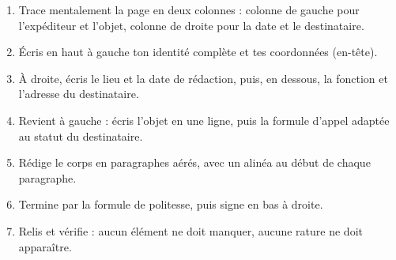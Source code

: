 \documentclass[11pt]{article}
\begin{document}
\begin{methode}
\begin{enumerate}
\item Trace mentalement la page en deux colonnes : colonne de gauche pour l'expéditeur et l'objet, colonne de droite pour la date et le destinataire.
\item Écris en haut à gauche ton identité complète et tes coordonnées (en-tête).
\item À droite, écris le lieu et la date de rédaction, puis, en dessous, la fonction et l'adresse du destinataire.
\item Revient à gauche : écris l'objet en une ligne, puis la formule d'appel adaptée au statut du destinataire.
\item Rédige le corps en paragraphes aérés, avec un alinéa au début de chaque paragraphe.
\item Termine par la formule de politesse, puis signe en bas à droite.
\item Relis et vérifie : aucun élément ne doit manquer, aucune rature ne doit apparaître.
\end{enumerate}
\end{methode}
\end{document}
